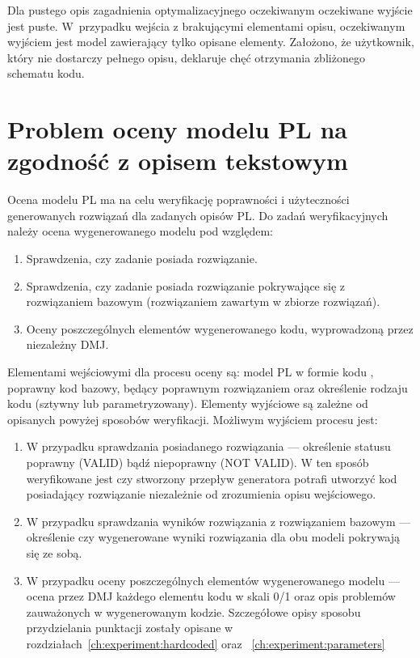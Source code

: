 Dla pustego opis zagadnienia optymalizacyjnego oczekiwanym oczekiwane wyjście jest puste. W~przypadku wejścia z brakującymi elementami opisu, oczekiwanym wyjściem jest model zawierający tylko opisane elementy. Założono, że użytkownik, który nie dostarczy pełnego opisu, deklaruje chęć otrzymania zbliżonego schematu kodu. %

\section{Problem oceny modelu PL na zgodność z opisem tekstowym}

Ocena modelu PL ma na celu weryfikację poprawności i użyteczności generowanych rozwiązań dla zadanych opisów PL. Do zadań weryfikacyjnych należy ocena wygenerowanego modelu pod względem:

\begin{enumerate}
    \item Sprawdzenia, czy zadanie posiada rozwiązanie.
    \item Sprawdzenia, czy zadanie posiada rozwiązanie pokrywające się z rozwiązaniem bazowym (rozwiązaniem zawartym w zbiorze rozwiązań).
    \item Oceny poszczególnych elementów wygenerowanego kodu, wyprowadzoną przez niezależny DMJ.
\end{enumerate}

Elementami wejściowymi dla procesu oceny są: model PL w formie kodu , poprawny kod bazowy, będący poprawnym rozwiązaniem oraz określenie rodzaju kodu (sztywny lub parametryzowany). Elementy wyjściowe są zależne od opisanych powyżej sposobów weryfikacji. Możliwym wyjściem procesu jest:

\begin{enumerate}
    \item W przypadku sprawdzania posiadanego rozwiązania --- określenie statusu poprawny (VALID) bądź niepoprawny (NOT VALID). W ten sposób weryfikowane jest czy stworzony przepływ generatora potrafi utworzyć kod posiadający rozwiązanie niezależnie od zrozumienia opisu wejściowego.
    \item W przypadku sprawdzania wyników rozwiązania z rozwiązaniem bazowym --- określenie czy wygenerowane wyniki rozwiązania dla obu modeli pokrywają się ze sobą.
    \item W przypadku oceny poszczególnych elementów wygenerowanego modelu --- ocena przez DMJ każdego elementu kodu w skali 0/1 oraz opis problemów zauważonych w wygenerowanym kodzie. Szczegółowe opisy sposobu przydzielania punktacji zostały opisane w rozdziałach~\ref{ch:experiment:hardcoded} oraz ~\ref{ch:experiment:parameters}
\end{enumerate}


